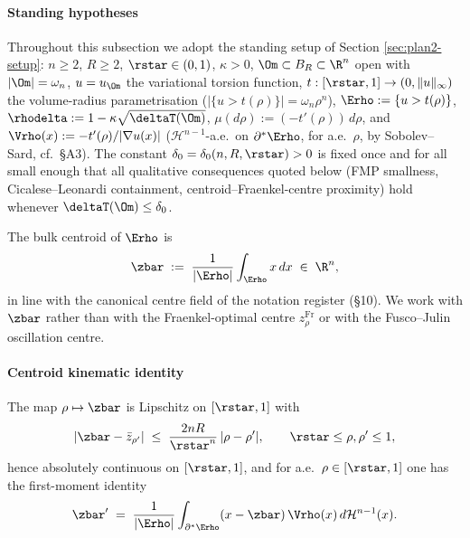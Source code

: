 \paragraph{Standing hypotheses}

Throughout this subsection we adopt the standing setup of Section
\ref{sec:plan2-setup}: $n\ge 2$, $R\ge 2$, $\rstar\in(0,1)$, $\kappa>0$,
$\Om\subset B_R\subset\R^n$ open with $|\Om|=\omega_n$,
$u=u_\Om$ the variational torsion function,
$t:[\rstar,1]\to(0,\|u\|_\infty)$ the volume-radius parametrisation
($|\{u>t(\rho)\}|=\omega_n\rho^n$), $\Erho:=\{u>t(\rho)\}$,
$\rhodelta:=1-\kappa\sqrt{\deltaT(\Om)}$,
$\mu(d\rho):=(-t'(\rho))\,d\rho$, and
$\Vrho(x):=-t'(\rho)/|\nabla u(x)|$ ($\mathcal H^{n-1}$-a.e.\ on
$\partial^{*}\Erho$, for a.e.\ $\rho$, by Sobolev--Sard, cf.\ §A3).
The constant $\delta_0=\delta_0(n,R,\rstar)>0$ is fixed once and for
all small enough that all qualitative consequences quoted below (FMP
smallness, Cicalese--Leonardi containment, centroid--Fraenkel-centre
proximity) hold whenever $\deltaT(\Om)\le\delta_0$.

The bulk centroid of $\Erho$ is
\begin{equation}\label{eq:aux-centroid-def}
   \zbar \;:=\; \frac{1}{|\Erho|}\int_{\Erho} x\,dx
   \;\in\;\R^{n},
\end{equation}
in line with the canonical centre field of the notation register
(§10). We work with $\zbar$ rather than with the Fraenkel-optimal
centre $z^{\mathrm{Fr}}_{\rho}$ or with the Fusco--Julin oscillation
centre.

\paragraph{Centroid kinematic identity}

\begin{lemma}\label{lem:centroid-kin}
The map $\rho\mapsto\zbar$ is Lipschitz on $[\rstar,1]$ with
\[
   |\zbar-\bar z_{\rho'}|
   \;\le\;
   \frac{2nR}{\rstar^{n}}\,|\rho-\rho'|,
   \qquad \rstar\le\rho,\rho'\le 1,
\]
hence absolutely continuous on $[\rstar,1]$, and for a.e.\
$\rho\in[\rstar,1]$ one has the first-moment identity
\begin{equation}\label{eq:centroid-kin}
   \zbar^{\prime}
   \;=\;
   \frac{1}{|\Erho|}
   \int_{\partial^{*}\Erho}
   (x-\zbar)\,\Vrho(x)\,d\mathcal H^{n-1}(x).
\end{equation}
\end{lemma}

